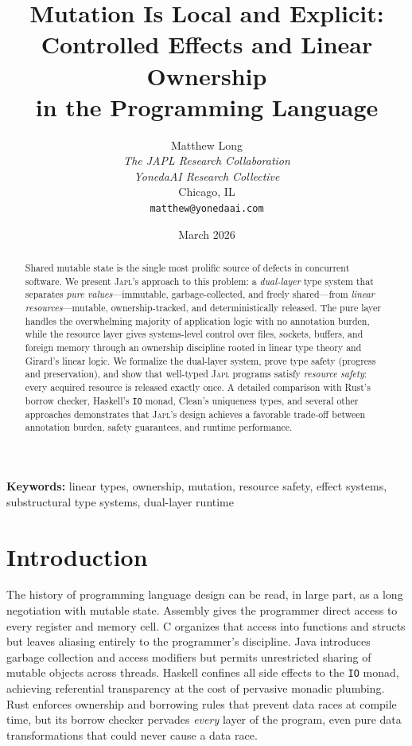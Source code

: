 \documentclass[11pt]{article}
\title{%
  \textbf{Mutation Is Local and Explicit:}\\[4pt]
  \large Controlled Effects and Linear Ownership\\
  in the \JAPL{} Programming Language%
}
\author{
  Matthew Long \\
  \textit{The JAPL Research Collaboration} \\
  \textit{YonedaAI Research Collective} \\
  Chicago, IL \\
  \texttt{matthew@yonedaai.com}
}
\date{March 2026}
\newcommand{\JAPL}{\textsc{Japl}}
\begin{document}
\maketitle

\begin{abstract}
Shared mutable state is the single most prolific source of defects in concurrent software.
We present \JAPL{}'s approach to this problem: a \emph{dual-layer} type system that
separates \emph{pure values}---immutable, garbage-collected, and freely
shared---from \emph{linear resources}---mutable, ownership-tracked, and
deterministically released.  The pure layer handles the overwhelming
majority of application logic with no annotation burden, while the
resource layer gives systems-level control over files, sockets,
buffers, and foreign memory through an ownership discipline rooted in
linear type theory and Girard's linear logic.  We formalize the
dual-layer system, prove type safety (progress and preservation), and
show that well-typed \JAPL{} programs satisfy \emph{resource safety}:
every acquired resource is released exactly once.  A detailed
comparison with Rust's borrow checker, Haskell's \texttt{IO} monad,
Clean's uniqueness types, and several other approaches demonstrates
that \JAPL{}'s design achieves a favorable trade-off between
annotation burden, safety guarantees, and runtime performance.
\end{abstract}

\medskip
\noindent\textbf{Keywords:}
linear types, ownership, mutation, resource safety, effect systems,
substructural type systems, dual-layer runtime

\newpage
\tableofcontents
\newpage

\section{Introduction}\label{sec:intro}

The history of programming language design can be read, in large part,
as a long negotiation with mutable state.  Assembly gives the
programmer direct access to every register and memory cell.  C
organizes that access into functions and structs but leaves aliasing
entirely to the programmer's discipline.  Java introduces garbage
collection and access modifiers but permits unrestricted sharing of
mutable objects across threads.  Haskell confines all side effects to
the \texttt{IO} monad, achieving referential transparency at the cost
of pervasive monadic plumbing.  Rust enforces ownership and borrowing
rules that prevent data races at compile time, but its borrow checker
pervades \emph{every} layer of the program, even pure data
transformations that could never cause a data race.
\end{document}
